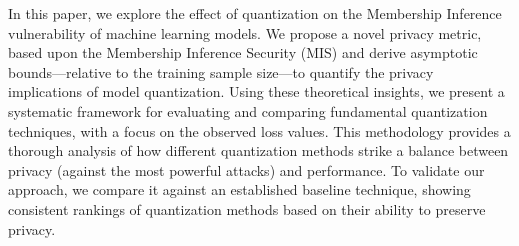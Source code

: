 In this paper, we explore the effect of quantization on the Membership Inference vulnerability of machine learning models. We propose a novel privacy metric, based upon the Membership Inference Security (MIS) \cite{aubinais2023fundamental}  and derive asymptotic bounds—relative to the training sample size—to quantify the privacy implications of model quantization. Using these theoretical insights, we present a systematic framework for evaluating and comparing fundamental quantization techniques, with a focus on the observed loss values. This methodology provides a thorough analysis of how different quantization methods strike a balance between privacy (against the most powerful attacks) and performance. To validate our approach, we compare it against an established baseline technique, showing consistent rankings of quantization methods based on their ability to preserve privacy.


